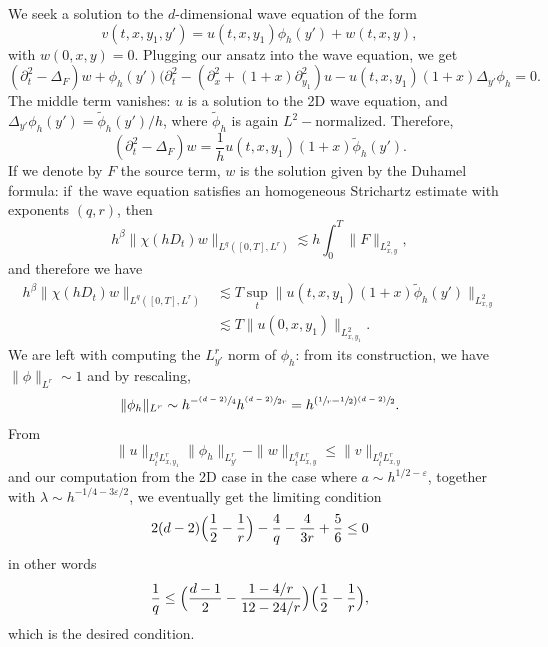 \documentclass[JEP,XML,SOM,Unicode,NoEqCountersInSection,NoFloatCountersInSection,published]{cedram}
\newcommand{\psfrac}[2]{\sfrac{(#1)}{#2}}
\theoremstyle{plain}
\theoremstyle{definition}
\begin{document}
We seek a solution to the $d$-dimensional wave equation of the form\vspace*{-3pt}
\[
v(t,x,y_{1},y')=u(t,x,y_{1}) \phi_{h}(y')+w(t,x,y),
\]
with $w(0,x,y)=0$. Plugging our ansatz into the wave equation, we get
\[
(\partial_{t}^{2} -\Delta_{F}) w+\phi_{h}(y')(\partial_{t}^{2} -(\partial_{x}^{2}+(1+x)\partial^{2}_{y_{1}}) u -u(t,x,y_{1}) (1+x)\Delta_{y'} \phi_{h}=0.
\]
The middle term vanishes: $u$ is a solution to the 2D wave equation, and $\Delta_{y'} \phi_{h}(y')= \tilde \phi_{h}(y') /h$, where $\tilde \phi_{h}$ is again $L^{2}-$normalized. Therefore,\vspace*{-3pt}
\[
(\partial_{t}^{2} -\Delta_{F}) w= \frac 1 h u(t,x,y_{1}) (1+x)\tilde \phi_{h}(y').
\]
If we denote by $F$ the source term, $w$ is the solution given by the Duhamel formula: if~the wave equation satisfies an homogeneous Strichartz estimate with exponents $(q,r)$, then\vspace*{-3pt}
\begin{equation*}\label{stricrdinhomo}
h^{\beta}\|\chi(hD_t)w\|_{L^q([0,T],
L^r)}\lesssim h \int_{0}^{T}\|F\|_{L^{2}_{x,y}},
\end{equation*}
and therefore we have
\begin{align*}
h^{\beta}\|\chi(hD_t)w\|_{L^q([0,T],
L^r)} & \lesssim T \sup_{t}\| u(t,x,y_{1}) (1+x)\tilde \phi_{h}(y')\|_{L^{2}_{x,y}}\\
& \lesssim T \| u(0,x,y_{1}) \|_{L^{2}_{x,y_{1}}}.
\end{align*}
We are left with computing the $L^{r}_{y'}$ norm of $ \phi_{h}$: from its construction, we have \hbox{$\|\phi\|_{L^{r}}\sim 1$} and by rescaling,
\[
\|\phi_h\|_{L^{r}}\sim h^{-\psfrac{d-2} 4} h^{\psfrac{d-2} {2r}}=h^{(\sfrac{1} {r}-\sfrac 1 2)\psfrac{d-2} 2}.
\]
From
\[
\|u\|_{L^{q}_{t}L^{r}_{x,y_{1}}} \|\phi_{h}\|_{L^{r}_{y'}} -\|w\|_{L^{q}_{t}L^{r}_{x,y}}\leq \|v\|_{L^{q}_{t}L^{r}_{x,y}}
\]
and our computation from the 2D case in the case where $a\sim h^{1/2-\varepsilon}$, together with $\lambda \sim h^{-1/4-3\varepsilon/2}$, we eventually get the limiting condition
\[
2(d-2)\Bigl(\frac 1 2-\frac 1 r\Bigr)- \frac 4{q}-\frac{4}{3r}+\frac 5 6\leq 0
\]
in other words
\[
\frac 1 q \leq \Bigl(\frac {d-1} 2 -\frac {1-4/r}{12-24/r}\Bigr) \Bigl(\frac 1 2 -\frac 1 r\Bigr),
\]
which is the desired condition.
\end{document}

